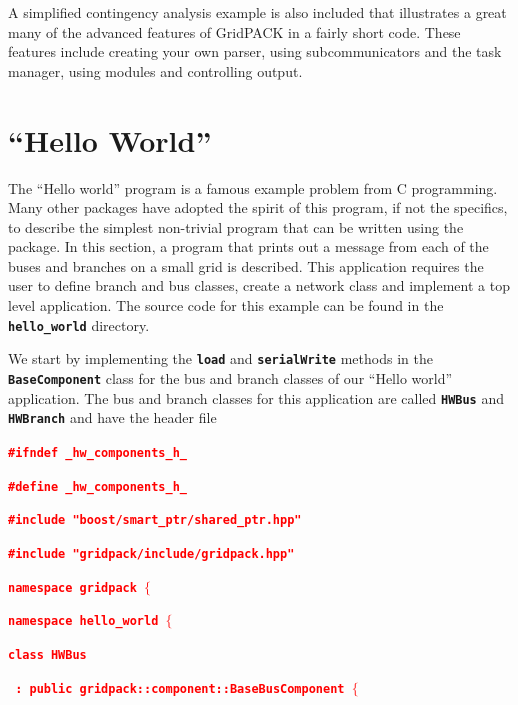 \documentclass[12pt]{report} %
\begin{document}
A simplified contingency analysis example is also included that illustrates a great many of the advanced features of GridPACK in a fairly short code. These features include creating your own parser, using subcommunicators and the task manager, using modules and controlling output.

\section{``Hello World''}

The ``Hello world'' program is a famous example problem from C programming. Many other packages have adopted the spirit of this program, if not the specifics, to describe the simplest non-trivial program that can be written using the package. In this section, a program that prints out a message from each of the buses and branches on a small grid is described. This application requires the user to define branch and bus classes, create a network class and implement a top level application. The source code for this example can be found in the \texttt{\textbf{hello\_world}} directory.

We start by implementing the \texttt{\textbf{load}} and \texttt{\textbf{serialWrite}} methods in the \texttt{\textbf{BaseComponent}} class for the bus and branch classes of our ``Hello world'' application. The bus and branch classes for this application are called \texttt{\textbf{HWBus}} and \texttt{\textbf{HWBranch}} and have the header file

\textcolor{red}{\texttt{\textbf{\#ifndef \_hw\_components\_h\_}}}

\textcolor{red}{\texttt{\textbf{\#define \_hw\_components\_h\_}}}

\textcolor{red}{\texttt{\textbf{}}}

\textcolor{red}{\texttt{\textbf{\#include "boost/smart\_ptr/shared\_ptr.hpp"}}}

\textcolor{red}{\texttt{\textbf{\#include "gridpack/include/gridpack.hpp"}}}

\textcolor{red}{\texttt{\textbf{}}}

\textcolor{red}{\texttt{\textbf{namespace gridpack $\boldsymbol{\mathrm{\{}}$}}}

\textcolor{red}{\texttt{\textbf{namespace hello\_world $\boldsymbol{\mathrm{\{}}$}}}

\textcolor{red}{\texttt{\textbf{}}}

\textcolor{red}{\texttt{\textbf{class HWBus}}}

\textcolor{red}{\texttt{\textbf{  : public gridpack::component::BaseBusComponent $\boldsymbol{\mathrm{\{}}$}}}
\end{document}
